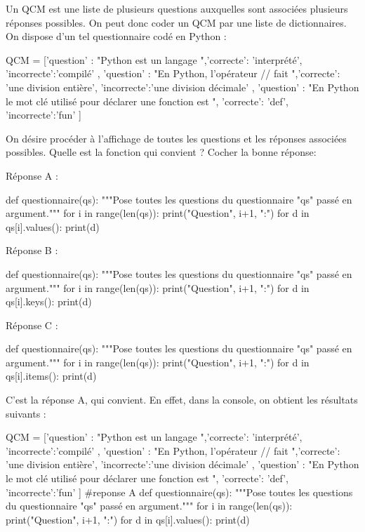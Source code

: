 \documentclass[a4paper,12,answers]{exam}
\begin{document}
\begin{questions}
\question Un QCM est une liste de plusieurs questions auxquelles sont associées plusieurs réponses possibles. On peut donc coder un QCM par une liste de dictionnaires.
On dispose d'un tel questionnaire codé en Python : \\
\begin{tcolorbox}[enhanced,colback=blue!5!white,colframe=blue!75!black]	
\begin{pyverbatim}
QCM = [{'question' : "Python est un langage  ",'correcte': 'interprété', 'incorrecte':'compilé' },
		{'question' : "En Python, l'opérateur // fait ",'correcte': 'une division entière',
		 'incorrecte':'une division décimale' },
		{'question' : "En Python le mot clé utilisé pour déclarer une fonction est  ",
		'correcte': 'def', 'incorrecte':'fun' }]
\end{pyverbatim} 
\end{tcolorbox}
On désire procéder à l'affichage de toutes les questions et les réponses associées possibles. Quelle est la fonction qui convient ?
Cocher la bonne réponse:
\begin{checkboxes}
\choice Réponse A : 
\begin{pyverbatim}
def questionnaire(qs):
	"""Pose toutes les questions du questionnaire "qs" passé en argument."""
	for i in range(len(qs)):
		print("Question", i+1, ":")
		for d in  qs[i].values():
			print(d)
\end{pyverbatim}
\choice Réponse B :
\begin{pyverbatim}
def questionnaire(qs):
	"""Pose toutes les questions du questionnaire "qs" passé en argument."""
	for i in range(len(qs)):
		print("Question", i+1, ":")
		for d in  qs[i].keys():
			print(d)
\end{pyverbatim}
\choice Réponse C :
\begin{pyverbatim}
def questionnaire(qs):
	"""Pose toutes les questions du questionnaire "qs" passé en argument."""
	for i in range(len(qs)):
		print("Question", i+1, ":")
		for d in  qs[i].items():
			print(d)
\end{pyverbatim}
\end{checkboxes}		
\begin{solution}
C'est la réponse A, qui convient. En effet, dans la console, on obtient les résultats suivants :
\begin{pyconsole}
QCM = [{'question' : "Python est un langage  ",'correcte': 'interprété', 'incorrecte':'compilé' },
{'question' : "En Python, l'opérateur // fait ",'correcte': 'une division entière',
	'incorrecte':'une division décimale' },
{'question' : "En Python le mot clé utilisé pour déclarer une fonction est  ",
	'correcte': 'def', 'incorrecte':'fun' }]
#reponse A
def questionnaire(qs):
	"""Pose toutes les questions du questionnaire "qs" passé en argument."""
	for i in range(len(qs)):
		print("Question", i+1, ":")
		for d in  qs[i].values():
			print(d)


\end{pyconsole}
\end{solution}
\end{questions}
\end{document}
